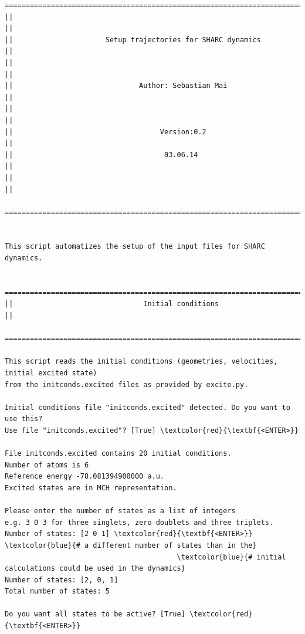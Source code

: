 \documentclass[a4paper,11pt,DIV=15,openany]{scrbook}
\begin{document}
\begin{oframed}
\footnotesize\begin{Verbatim}[commandchars=\\\{\}]
  ================================================================================
||                                                                                ||
||                      Setup trajectories for SHARC dynamics                     ||
||                                                                                ||
||                              Author: Sebastian Mai                             ||
||                                                                                ||
||                                   Version:0.2                                  ||
||                                    03.06.14                                    ||
||                                                                                ||
  ================================================================================


This script automatizes the setup of the input files for SHARC dynamics. 

  ================================================================================
||                               Initial conditions                               ||
  ================================================================================

This script reads the initial conditions (geometries, velocities, initial excited state)
from the initconds.excited files as provided by excite.py. 

Initial conditions file "initconds.excited" detected. Do you want to use this?
Use file "initconds.excited"? [True] \textcolor{red}{\textbf{<ENTER>}}

File initconds.excited contains 20 initial conditions.
Number of atoms is 6
Reference energy -78.081394900000 a.u.
Excited states are in MCH representation.

Please enter the number of states as a list of integers
e.g. 3 0 3 for three singlets, zero doublets and three triplets.
Number of states: [2 0 1] \textcolor{red}{\textbf{<ENTER>}}        \textcolor{blue}{# a different number of states than in the}
                                         \textcolor{blue}{# initial calculations could be used in the dynamics}
Number of states: [2, 0, 1]
Total number of states: 5

Do you want all states to be active? [True] \textcolor{red}{\textbf{<ENTER>}}


\end{Verbatim}
\end{oframed}
\end{document}
